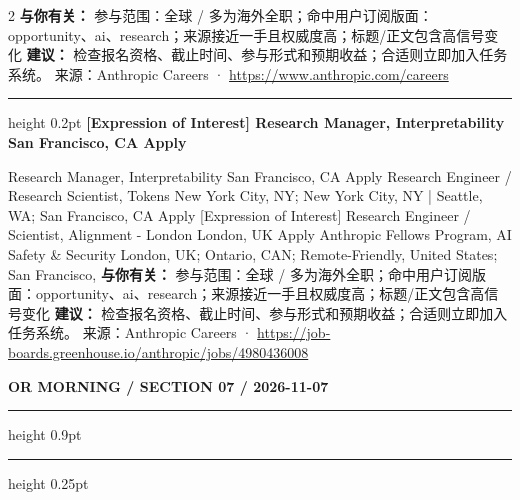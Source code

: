 \documentclass[10.5pt]{ctexart}
\begin{document}
\begin{multicols}{2}
\textbf{与你有关：} 参与范围：全球 / 多为海外全职；命中用户订阅版面：opportunity、ai、research；来源接近一手且权威度高；标题/正文包含高信号变化
\textbf{建议：} 检查报名资格、截止时间、参与形式和预期收益；合适则立即加入任务系统。
{\footnotesize\color{ormuted} 来源：Anthropic Careers · \url{https://www.anthropic.com/careers}}
\vspace{2mm}
\hrule height 0.2pt
\vspace{2mm}
{\large\bfseries [Expression of Interest] Research Manager, Interpretability San Francisco, CA Apply}\par
[Expression of Interest] Research Manager, Interpretability San Francisco, CA Apply Research Engineer / Research Scientist, Tokens New York City, NY; New York City, NY | Seattle, WA; San Francisco, CA Apply [Expression of Interest] Research Engineer / Scientist, Alignment - London London, UK Apply Anthropic Fellows Program, AI Safety \& Security London, UK; Ontario, CAN; Remote-Friendly, United States; San Francisco, 
\textbf{与你有关：} 参与范围：全球 / 多为海外全职；命中用户订阅版面：opportunity、ai、research；来源接近一手且权威度高；标题/正文包含高信号变化
\textbf{建议：} 检查报名资格、截止时间、参与形式和预期收益；合适则立即加入任务系统。
{\footnotesize\color{ormuted} 来源：Anthropic Careers · \url{https://job-boards.greenhouse.io/anthropic/jobs/4980436008}}
\end{multicols}
\newpage
{\small\bfseries OR MORNING / SECTION 07 / 2026-11-07}
\vspace{2mm}
\hrule height 0.9pt
\vspace{1.5mm}
\hrule height 0.25pt
\vspace{4mm}
\end{document}
